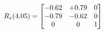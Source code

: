 \documentclass[preview]{standalone}
\begin{document}
\begin{align*}
\special{dvisvgm:raw <g id='unique000'>}R_{z}(4.05) = \begin{bmatrix}-0.62 & +0.79 & 0 \\-0.79 & -0.62 & 0 \\0 & 0 & 1\end{bmatrix}\special{dvisvgm:raw </g>}
\end{align*}
\end{document}
